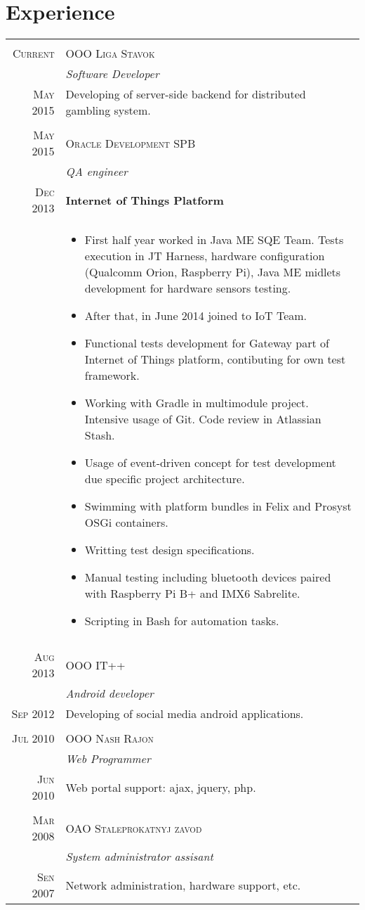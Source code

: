 \documentclass[a4paper,11pt]{article}
\begin{document}
\section{Experience}
	\begin{tabular}{r|p{11cm}}
		\multicolumn{2}{c}{} \\
			\textsc{Current}&	\textsc{OOO Liga Stavok}\\&			\emph{Software Developer} \\
			\textsc{May 2015}& Developing of server-side backend for distributed gambling system.\\
		\multicolumn{2}{c}{} \\
			\textsc{May 2015} & 	\textsc{Oracle Development SPB} \\ & 	\emph{QA engineer} \\
	  		\textsc{Dec 2013} & 	\textbf{Internet of Things Platform}\\ &
			\begin{itemize}
	  			\item First half year worked in Java ME SQE Team. Tests execution in JT Harness, hardware configuration (Qualcomm Orion, Raspberry Pi), Java ME midlets development for hardware sensors testing.
				\item After that, in June 2014 joined to IoT Team.
				\item Functional tests development for Gateway part of Internet of Things platform, contibuting for own test framework.
				\item Working with Gradle in multimodule project. Intensive usage of Git. Code review in Atlassian Stash.
				\item Usage of event-driven concept for test development due specific project architecture.
				\item Swimming with platform bundles in Felix and Prosyst OSGi containers.
				\item Writting test design specifications.
				\item Manual testing including bluetooth devices paired with Raspberry Pi B+ and IMX6 Sabrelite.
				\item Scripting in  Bash for automation tasks.
			\end{itemize}\\
		\multicolumn{2}{c}{} \\
			\textsc{Aug 2013}&	\textsc{OOO IT++}\\&			\emph{Android developer} \\
			\textsc{Sep 2012}& Developing of social media android applications.\\
		\multicolumn{2}{c}{} \\
			\textsc{Jul 2010} & 	\textsc{OOO Nash Rajon}\\&		\emph{Web Programmer} \\
			\textsc{Jun 2010} & Web portal support: ajax, jquery, php.\\
		\multicolumn{2}{c}{} \\
			\textsc{Mar 2008} & 	\textsc{OAO Staleprokatnyj zavod}\\&	\emph{System administrator assisant}\\
			\textsc{Sen 2007}& Network administration, hardware support, etc.
	\end{tabular}
\end{document}
